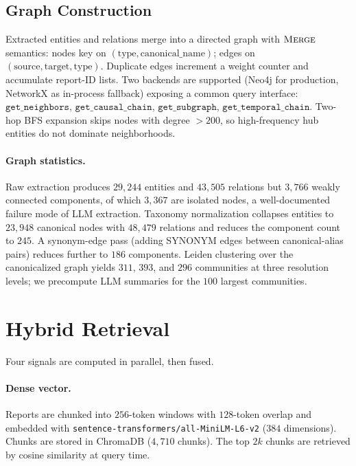 \documentclass[10pt,a4paper]{article}
\begin{document}
\subsection{Graph Construction}

Extracted entities and relations merge into a directed graph with
$\textsc{Merge}$ semantics: nodes key on $(\text{type},
\text{canonical\_name})$; edges on $(\text{source}, \text{target},
\text{type})$. Duplicate edges increment a weight counter and
accumulate report-ID lists. Two backends are supported (Neo4j for
production, NetworkX as in-process fallback) exposing a common query
interface: $\texttt{get\_neighbors}$, $\texttt{get\_causal\_chain}$,
$\texttt{get\_subgraph}$, $\texttt{get\_temporal\_chain}$.
Two-hop BFS expansion skips nodes with degree $> 200$, so
high-frequency hub entities do not dominate neighborhoods.

\paragraph{Graph statistics.}
Raw extraction produces $29{,}244$ entities and $43{,}505$ relations
but $3{,}766$ weakly connected components, of which $3{,}367$ are
isolated nodes, a well-documented failure mode of LLM extraction.
Taxonomy normalization collapses entities to $23{,}948$ canonical
nodes with $48{,}479$ relations and reduces the component count to
$245$. A synonym-edge pass (adding \textsc{SYNONYM} edges between
canonical-alias pairs) reduces further to $186$ components. Leiden
clustering over the canonicalized graph yields $311$, $393$, and
$296$ communities at three resolution levels; we precompute LLM
summaries for the $100$ largest communities.

\section{Hybrid Retrieval}
\label{sec:retrieval}

Four signals are computed in parallel, then fused.

\paragraph{Dense vector.}
Reports are chunked into $256$-token windows with $128$-token overlap
and embedded with \texttt{sentence-transformers/all-MiniLM-L6-v2}
\citep{reimers2019sbert} ($384$ dimensions). Chunks are stored in
ChromaDB ($4{,}710$ chunks). The top $2k$ chunks are retrieved by
cosine similarity at query time.
\end{document}
